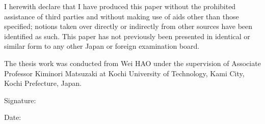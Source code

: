 \begin{declaration}
	
	I herewith declare that I have produced this paper without the prohibited
	assistance of third parties and without making use of aids other than those
	specified; notions taken over directly or indirectly from other sources have
	been identified as such. This paper has not previously been presented in
	identical or similar form to any other Japan or foreign examination board.
	
	The thesis work was conducted from Wei HAO under the supervision of Associate
	Professor Kiminori Matsuzaki at Kochi University of Technology, Kami City, Kochi
	Prefecture, Japan.
	
	\vspace{70mm}
	
	\hspace{80mm} Signature:
	
	\hspace{80mm} Date:
	
\end{declaration}
